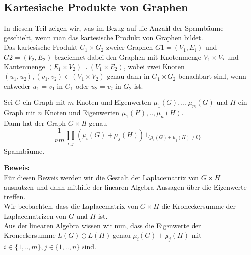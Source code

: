 \subsection{Kartesische Produkte von Graphen}
In diesem Teil zeigen wir, was im Bezug auf die Anzahl der Spannbäume geschieht, wenn man das kartesische Produkt von Graphen bildet.\\
Das kartesische Produkt $G_1\times G_2$ zweier Graphen $G1=(V_1,E_1)$ und $G2=(V_2,E_2)$ bezeichnet dabei den Graphen mit Knotenmenge $V_1\times V_2$ und Kantenmenge $(E_1\times V_2)\cup(V_1\times E_2)$, wobei zwei Knoten $(u_1,u_2), (v_1,v_2) \in (V_1\times V_2)$ genau dann in $G_1\times G_2$ benachbart sind, wenn entweder $u_1=v_1$ in $G_1$ oder $u_2=v_2$ in $G_2$ ist.\\
\begin{Tms}
 Sei $G$ ein Graph mit $m$ Knoten und Eigenwerten $\mu_1(G),..,\mu_m(G)$ und $H$ ein Graph mit $n$ Knoten und Eigenwerten $\mu_1(H),..,\mu_n(H)$. \\
Dann hat der Graph $G \times H$ genau
\begin{equation}
\frac{1}{nm}\displaystyle\prod_{i,j}(\mu_i(G)+\mu_j(H))1_{\{\mu_i(G)+\mu_j(H)\neq0\}}
\end{equation}
Spannbäume.
\label{tmcpG}
\end{Tms}
\textbf{Beweis:}\\
Für diesen Beweis werden wir die Gestalt der Laplacematrix von $G \times H$ ausnutzen und dann mithilfe der linearen Algebra Aussagen über die Eigenwerte treffen.\\
Wir beobachten, dass die Laplacematrix von $G\times H$ die Kroneckersumme der Laplacematrizen von $G$ und $H$ ist.\\
Aus der linearen Algebra wissen wir nun, dass die Eigenwerte der Kroneckersumme $L(G) \oplus L(H)$ genau $\mu_i(G)+\mu_j(H)$ mit $i \in \{ 1,..,m\}, j \in \{ 1,..,n\}$ sind.\\
